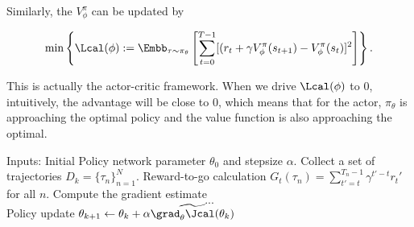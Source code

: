 Similarly, the $V^{\pi}_{\phi}$ can be updated by

\begin{align}
     \min \left\{\Lcal(\phi):= \Embb_{\tau\sim \pi_{\theta}}\left[ \sum_{t=0}^{T-1}[(r_t+\gamma V^{\pi}_{\phi}(s_{t+1}) - V^{\pi}_{\phi}(s_t)]^2\right]\right\}.
     \label{eq:naive.critic.obj}
\end{align}

This is actually the actor-critic framework. When we drive $\Lcal(\phi)$ to 0, intuitively, the advantage will be close to 0, which means that for the actor, $\pi_{\theta}$ is approaching the optimal policy and the value function is also approaching the optimal.



\begin{algorithm}[H]
\caption{Naive Actor-Critic Algorithm}
\begin{algorithmic}[1]
    \State Inputs: Initial Policy network parameter $\theta_0$ and stepsize $\alpha$.
        \State Collect a set of trajectories $D_k=\{\tau_n\}_{n=1}^{N}$.
        \State Reward-to-go calculation $G_t(\tau_n) = \sum_{t'=t}^{T_n-1}\gamma^{t'-t}r_t'$ for all $n$.
        \State Compute the gradient estimate
         $$
           ...
        $$
        \State Policy update $\theta_{k+1} \gets \theta_k + \alpha \widetilde{\grad_{\theta} \Jcal(\theta_k)}$
    \EndFor
\end{algorithmic}
\label{algo:actor-critic}
\end{algorithm}


